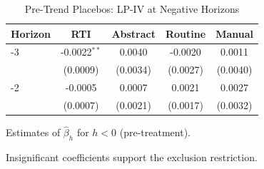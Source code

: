 \begin{table}[htbp]
\centering
\caption{Pre-Trend Placebos: LP-IV at Negative Horizons}
\label{tab:placebos}
\begin{tabular}{lcccc}
\hline\hline
Horizon & RTI & Abstract & Routine & Manual \\
\hline
-3 & -0.0022$^{**}$ & 0.0040 & -0.0020 & 0.0011 \\
 & (0.0009) & (0.0034) & (0.0027) & (0.0040) \\[3pt]
-2 & -0.0005 & 0.0007 & 0.0021 & 0.0027 \\
 & (0.0007) & (0.0021) & (0.0017) & (0.0032) \\[3pt]
\hline\hline
\end{tabular}
\begin{tablenotes}\small
\item Estimates of $\hat{\beta}_h$ for $h < 0$ (pre-treatment).
\item Insignificant coefficients support the exclusion restriction.
\end{tablenotes}
\end{table}